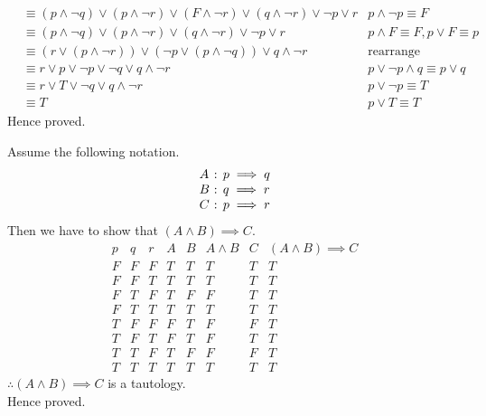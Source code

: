 \documentclass[addpoints]{exam}
\begin{document}
\begin{questions}
\begin{parts}
\begin{solution}
\begin{align*}
        & \equiv (p\land \lnot q) \lor  (p\land \lnot r) \lor  (F\land \lnot r)  \lor  (q\land \lnot r) \lor  \lnot p \lor   r & p\land \lnot p \equiv F\\
        & \equiv (p\land \lnot q) \lor  (p\land \lnot r) \lor  (q\land \lnot r) \lor  \lnot p \lor   r & p\land F\equiv F, p\lor F\equiv p\\
        & \equiv (r \lor  (p\land \lnot r))  \lor  (\lnot p \lor  (p\land \lnot q)) \lor q\land \lnot r & \text{rearrange}\\
        & \equiv r \lor  p  \lor  \lnot p \lor  \lnot q \lor  q\land \lnot r & p\lor \lnot p\land q\equiv p\lor q\\
        & \equiv r \lor  T \lor  \lnot q \lor  q\land\lnot r & p \lor  \lnot p\equiv T\\
        & \equiv T & p\lor T\equiv T
      \end{align*}
      Hence proved.
    \end{solution}
    \begin{solution} Assume the following notation.
      \[
        \begin{array}{l@{\text{ : }}l}
          A & p \implies q\\
          B & q \implies r\\
          C & p \implies r
        \end{array}
      \]
      Then we have to show that $(A \land B) \implies C$.
      \[
        \begin{array}{*{3}{c|}*{5}{|c}}
          p & q & r & A & B & A \land B & C & (A \land B) \implies C\\
          \hline
          F & F & F & T & T & T & T & T \\
          F & F & T & T & T & T & T & T \\
          F & T & F & T & F & F & T & T \\
          F & T & T & T & T & T & T & T \\
          T & F & F & F & T & F & F & T \\
          T & F & T & F & T & F & T & T \\
          T & T & F & T & F & F & F & T \\
          T & T & T & T & T & T & T & T 
        \end{array}
      \]
      $\therefore (A \land B) \implies C$ is a tautology.\\
      Hence proved.
    \end{solution}
    

\end{parts}
\end{questions}
\end{document}
